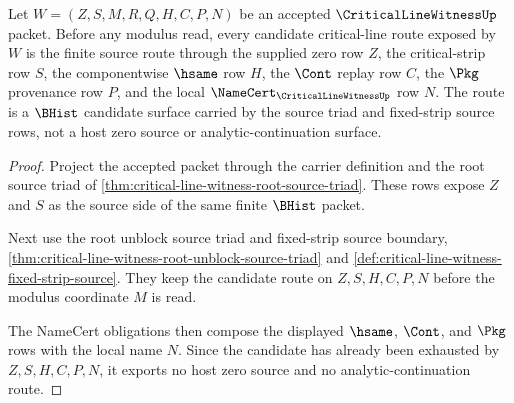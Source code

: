 \begin{theorem}
\label{thm:critical-line-witness-candidate-closed-route}
Let $W=(Z,S,M,R,Q,H,C,P,N)$ be an accepted $\CriticalLineWitnessUp$ packet. Before any modulus read, every candidate critical-line route exposed by $W$ is the finite source route through the supplied zero row $Z$, the critical-strip row $S$, the componentwise $\hsame$ row $H$, the $\Cont$ replay row $C$, the $\Pkg$ provenance row $P$, and the local $\NameCert_{\CriticalLineWitnessUp}$ row $N$. The route is a $\BHist$ candidate surface carried by the source triad and fixed-strip source rows, not a host zero source or analytic-continuation surface.
\end{theorem}
\begin{proof}
Project the accepted packet through the carrier definition and the root source triad of \autoref{thm:critical-line-witness-root-source-triad}. These rows expose $Z$ and $S$ as the source side of the same finite $\BHist$ packet.

Next use the root unblock source triad and fixed-strip source boundary, \autoref{thm:critical-line-witness-root-unblock-source-triad} and \autoref{def:critical-line-witness-fixed-strip-source}. They keep the candidate route on $Z,S,H,C,P,N$ before the modulus coordinate $M$ is read.

The NameCert obligations then compose the displayed $\hsame$, $\Cont$, and $\Pkg$ rows with the local name $N$. Since the candidate has already been exhausted by $Z,S,H,C,P,N$, it exports no host zero source and no analytic-continuation route.
\end{proof}

